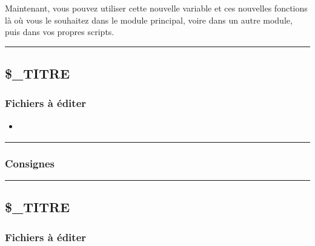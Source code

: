 \documentclass[a4paper,10pt]{article}
\begin{document}
Maintenant, vous pouvez utiliser cette nouvelle variable et ces nouvelles fonctions là où vous le souhaitez dans le module principal, voire dans un autre module, puis dans vos propres scripts.\\[1\baselineskip]




\color{green}\par\noindent\rule{\textwidth}{0.4pt}\color{white}

\color{green}
\subsection{\$\_TITRE}\color{white}

\color{blue}
\subsubsection{Fichiers à éditer}\color{white}

\begin{itemize}
    \item \textbf{\color{lime}\color{white}}
\end{itemize}



\color{blue}\par\noindent\rule{\textwidth}{0.4pt}\color{white}

\color{blue}
\subsubsection{Consignes}\color{white}




\color{green}\par\noindent\rule{\textwidth}{0.4pt}\color{white}

\color{green}
\subsection{\$\_TITRE}\color{white}

\color{blue}
\subsubsection{Fichiers à éditer}\color{white}
\end{document}
